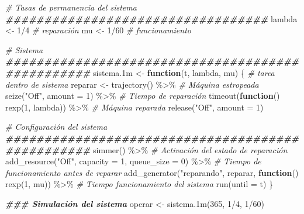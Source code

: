 \documentclass[
]{book}
\newenvironment{Shaded}{\begin{snugshade}}{\end{snugshade}}
\newcommand{\AttributeTok}[1]{\textcolor[rgb]{0.77,0.63,0.00}{#1}}
\newcommand{\CommentTok}[1]{\textcolor[rgb]{0.56,0.35,0.01}{\textit{#1}}}
\newcommand{\ControlFlowTok}[1]{\textcolor[rgb]{0.13,0.29,0.53}{\textbf{#1}}}
\newcommand{\DecValTok}[1]{\textcolor[rgb]{0.00,0.00,0.81}{#1}}
\newcommand{\DocumentationTok}[1]{\textcolor[rgb]{0.56,0.35,0.01}{\textbf{\textit{#1}}}}
\newcommand{\FloatTok}[1]{\textcolor[rgb]{0.00,0.00,0.81}{#1}}
\newcommand{\FunctionTok}[1]{\textcolor[rgb]{0.00,0.00,0.00}{#1}}
\newcommand{\NormalTok}[1]{#1}
\newcommand{\OtherTok}[1]{\textcolor[rgb]{0.56,0.35,0.01}{#1}}
\newcommand{\SpecialCharTok}[1]{\textcolor[rgb]{0.00,0.00,0.00}{#1}}
\newcommand{\StringTok}[1]{\textcolor[rgb]{0.31,0.60,0.02}{#1}}
\theoremstyle{definition}
\theoremstyle{definition}
\theoremstyle{definition}
\theoremstyle{definition}
\theoremstyle{remark}
\begin{document}
\begin{Shaded}
\begin{Highlighting}[]
\CommentTok{\# Tasas de permanencia del sistema}
\DocumentationTok{\#\#\#\#\#\#\#\#\#\#\#\#\#\#\#\#\#\#\#\#\#\#\#\#\#\#\#\#\#\#\#\#\#\#}
\NormalTok{lambda }\OtherTok{\textless{}{-}} \DecValTok{1}\SpecialCharTok{/}\DecValTok{4}  \CommentTok{\# reparación}
\NormalTok{mu }\OtherTok{\textless{}{-}} \DecValTok{1}\SpecialCharTok{/}\DecValTok{60}     \CommentTok{\# funcionamiento}

\CommentTok{\# Sistema}
\DocumentationTok{\#\#\#\#\#\#\#\#\#\#\#\#\#\#\#\#\#\#\#\#\#\#\#\#\#\#\#\#\#\#\#\#\#\#\#\#\#\#\#\#\#\#\#\#\#\#\#\#\#}
\NormalTok{sistema}\FloatTok{.1}\NormalTok{m }\OtherTok{\textless{}{-}} \ControlFlowTok{function}\NormalTok{(t, lambda, mu)}
\NormalTok{\{}
  \CommentTok{\# tarea dentro de sistema}
\NormalTok{  reparar }\OtherTok{\textless{}{-}} \FunctionTok{trajectory}\NormalTok{() }\SpecialCharTok{\%\textgreater{}\%}
    \CommentTok{\# Máquina estropeada}
    \FunctionTok{seize}\NormalTok{(}\StringTok{"Off"}\NormalTok{, }\AttributeTok{amount =} \DecValTok{1}\NormalTok{) }\SpecialCharTok{\%\textgreater{}\%}              
    \CommentTok{\# Tiempo de reparación}
    \FunctionTok{timeout}\NormalTok{(}\ControlFlowTok{function}\NormalTok{() }\FunctionTok{rexp}\NormalTok{(}\DecValTok{1}\NormalTok{, lambda)) }\SpecialCharTok{\%\textgreater{}\%}   
    \CommentTok{\# Máquina reparada}
    \FunctionTok{release}\NormalTok{(}\StringTok{"Off"}\NormalTok{, }\AttributeTok{amount =} \DecValTok{1}\NormalTok{)               }

  \CommentTok{\# Configuración del sistema }
  \DocumentationTok{\#\#\#\#\#\#\#\#\#\#\#\#\#\#\#\#\#\#\#\#\#\#\#\#\#\#\#\#\#\#\#\#\#\#\#\#\#\#\#\#\#\#\#\#\#\#\#\#\#}
  \FunctionTok{simmer}\NormalTok{() }\SpecialCharTok{\%\textgreater{}\%}
    \CommentTok{\# Activación del estado de reparación}
    \FunctionTok{add\_resource}\NormalTok{(}\StringTok{"Off"}\NormalTok{, }\AttributeTok{capacity =} \DecValTok{1}\NormalTok{, }\AttributeTok{queue\_size =} \DecValTok{0}\NormalTok{) }\SpecialCharTok{\%\textgreater{}\%}           
    \CommentTok{\# Tiempo de funcionamiento antes de reparar}
    \FunctionTok{add\_generator}\NormalTok{(}\StringTok{"reparando"}\NormalTok{, reparar, }\ControlFlowTok{function}\NormalTok{() }\FunctionTok{rexp}\NormalTok{(}\DecValTok{1}\NormalTok{, mu)) }\SpecialCharTok{\%\textgreater{}\%} 
    \CommentTok{\# Tiempo funcionamiento del sistema}
    \FunctionTok{run}\NormalTok{(}\AttributeTok{until =}\NormalTok{ t)     }
\NormalTok{\}}

\DocumentationTok{\#\#\# Simulación del sistema}
\NormalTok{operar }\OtherTok{\textless{}{-}} \FunctionTok{sistema.1m}\NormalTok{(}\DecValTok{365}\NormalTok{, }\DecValTok{1}\SpecialCharTok{/}\DecValTok{4}\NormalTok{, }\DecValTok{1}\SpecialCharTok{/}\DecValTok{60}\NormalTok{)}
\end{Highlighting}
\end{Shaded}
\end{document}

